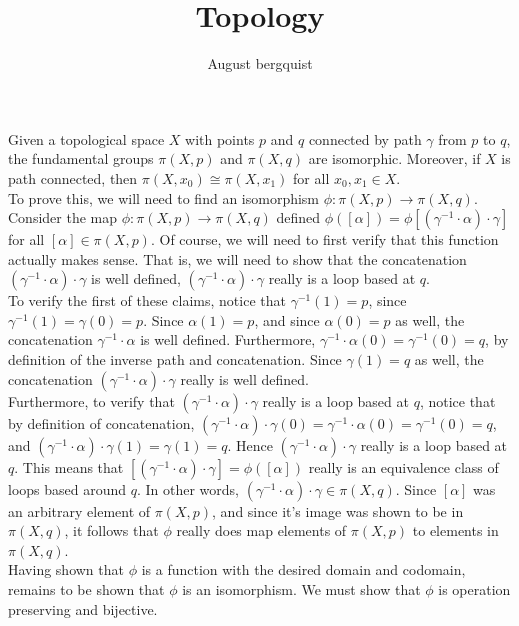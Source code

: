 \documentclass{article}
\title{Topology}
\author{August bergquist}
\newcommand{\inv}[1]{#1^{-1}}
\newcommand{\inv}[1]{#1^{-1}}
\begin{document}
\maketitle

 Given a topological space $X$ with points $p$ and $q$ connected by path  $\gamma$ from $p$ to $q$, the fundamental groups $\pi(X,p)$ and $\pi(X,q)$ are isomorphic. Moreover, if $X$ is path connected, then $\pi(X,x_0)\cong \pi(X,x_1)$ for all $x_0,x_1\in X$.\\

 To prove this, we will need to find an isomorphism $\phi:\pi(X,p)\rightarrow \pi(X,q)$. Consider the map $\phi:\pi(X,p)\rightarrow \pi(X,q)$ defined $\phi([\alpha]) = \phi[(\inv{\gamma}\cdot\alpha)\cdot\gamma]$ for all $[\alpha]\in \pi(X,p)$. Of course, we will need to first verify that this function actually makes sense. That is, we will need to show that the concatenation $(\inv{\gamma}\cdot \alpha)\cdot \gamma$ is well defined, $(\inv{\gamma}\cdot \alpha)\cdot \gamma$ really is a loop based at $q$. \\

To verify the first of these claims, notice that $\inv{\gamma}(1) = p$, since $\inv{\gamma}(1) = \gamma(0) = p$. Since $\alpha(1) = p$, and since $\alpha(0) = p$ as well, the concatenation $\inv{\gamma}\cdot \alpha$ is well defined. Furthermore, $\inv{\gamma}\cdot\alpha(0) = \inv{\gamma}(0) = q$, by definition of the inverse path and concatenation. Since $\gamma(1) = q$ as well, the concatenation $(\inv{\gamma}\cdot \alpha)\cdot \gamma$ really is well defined. \\

Furthermore, to verify that $(\inv{\gamma}\cdot \alpha)\cdot \gamma$ really is a loop based at $q$, notice that by definition of concatenation, 
$(\inv{\gamma}\cdot \alpha)\cdot \gamma(0) =  \inv{\gamma}\cdot \alpha(0) = \inv{\gamma}(0) = q$, and $(\inv{\gamma}\cdot \alpha)\cdot \gamma(1) = \gamma(1) = q$. Hence $(\inv{\gamma}\cdot \alpha)\cdot \gamma$ really is a loop based at $q$. This means that $[(\inv{\gamma}\cdot \alpha)\cdot \gamma] = \phi([\alpha])$ really is an equivalence class of loops based around $q$. In other words, $(\inv{\gamma}\cdot \alpha)\cdot \gamma \in \pi(X,q)$. Since $[\alpha]$ was an arbitrary element of $\pi(X,p)$, and since it's image was shown to be in $\pi(X,q)$, it follows that $\phi$ really does map elements of $\pi(X,p)$ to elements in $\pi(X,q)$.\\

Having shown that $\phi$ is a function with the desired domain and codomain, remains to be shown that $\phi$ is an isomorphism. We must show that $\phi$ is operation preserving and bijective.\\
\end{document}
